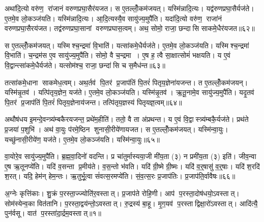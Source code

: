 अथा॑दि॒त्यो वरु॑ण॒ रा॑जानं वरुणप्रघा॒सैर॑यजत। स ए॒तल्लोँ॒कम॑जयत्। यस्मि॑न्नादि॒त्यः। यद्व॑रुणप्रघा॒सैर्यज॑ते। ए॒तमे॒व लो॒कञ्ज॑यति। यस्मि॑न्नादि॒त्यः। आ॒दि॒त्यस्यै॒व सायु॑ज्य॒मुपै॑ति। यदा॑दि॒त्यो वरु॑ण॒ राजा॑नं वरुणप्रघा॒सै\-रय॑जत। तद्व॑रुणप्रघा॒सानां वरुणप्रघास॒त्वम्। अथ॒ सोमो॒ राजा॒ छन्दासि साकमे॒धैर॑यजत॥६२॥

स ए॒तल्लोँ॒कम॑जयत्। यस्मिश्च॒न्द्रमा॑ वि॒भाति॑। यत्सा॑कमे॒धैर्यज॑ते। ए॒तमे॒व लो॒कञ्ज॑यति। यस्मिश्च॒न्द्रमा॑ वि॒भाति॑। च॒न्द्रम॑स ए॒व सायु॑ज्य॒मुपै॑ति। सोमो॒ वै च॒न्द्रमा। ए॒ष ह॒ त्वै सा॒क्षात्सोमं॑ भक्षयति। य ए॒वं वि॒द्वान्त्सा॑कमे॒धैर्यज॑ते। यत्सोम॑श्च॒ राजा॒ छन्दा॑सि च स॒मैध॑न्त॥६३॥

तत्सा॑कमे॒धाना साकमेध॒त्वम्। अथ॒र्तव॑ पि॒तर॑ प्र॒जाप॑तिं पि॒तरं॑ पितृय॒ज्ञेना॑यजन्त। त ए॒तल्लोँ॒कम॑जयन्। यस्मि॑न्नृ॒तव॑। यत्पि॑तृय॒ज्ञेन॒ यज॑ते। ए॒तमे॒व लो॒कञ्ज॑यति। यस्मि॑न्नृ॒तव॑। ऋ॒तू॒नामे॒व सायु॑ज्य॒मुपै॑ति। यदृ॒तव॑ पि॒तर॑ प्र॒जाप॑तिं पि॒तरं॑ पितृय॒ज्ञेनाय॑जन्त। तत्पि॑तृय॒ज्ञस्य॑ पितृयज्ञ॒त्वम्॥६४॥

अथौष॑धय इ॒मन्दे॒वन्त्र्य॑म्बकैरयजन्त॒ प्रथे॑म॒हीति॑। ततो॒ वै ता अ॑प्रथन्त। य ए॒वं वि॒द्वास्त्र्य॑म्बकै॒र्यज॑ते। प्रथ॑ते प्र॒जया॑ प॒शुभि॑। अथ॑ वा॒युः प॑रमे॒ष्ठिन शुनासी॒रीये॑णायजत। स ए॒तल्लोँ॒कम॑जयत्। यस्मि॑न्वा॒युः। यच्छु॑नासी॒रीये॑ण॒ यज॑ते। ए॒तमे॒व लो॒कञ्ज॑यति। यस्मि॑न्वा॒युः॥६५॥

वा॒योरे॒व सायु॑ज्य॒मुपै॑ति। ब्र॒ह्म॒वा॒दिनो॑ वदन्ति। प्र चा॑तुर्मास्यया॒जी मी॑य॒ता (३) न प्रमी॑य॒ता (३) इति॑। जीव॒न्वा ए॒ष ऋ॒तूनप्ये॑ति। यदि॑ व॒सन्ता प्र॒मीय॑ते। व॒स॒न्तो भ॑वति। यदि॑ ग्री॒ष्मे ग्री॒ष्मः। यदि॑ व॒र्॒षासु॑ व॒र्॒षाः। यदि॑ श॒रदि॑ श॒रत्। यदि॒ हेम॑न् हेम॒न्तः। ऋ॒तुर्भू॒त्वा सं॑वत्स॒रमप्ये॑ति। सं॒व॒त्स॒रः प्र॒जाप॑तिः। प्र॒जाप॑ति॒र्वावैषः॥६६॥





\clearpage
{}
\setcounter{anuvakam}{0}
अ॒ग्नेः कृत्ति॑काः। शु॒क्रं प॒रस्ता॒ज्ज्योति॑र॒वस्तात्। प्र॒जाप॑ते रोहि॒णी। आप॑ प॒रस्ता॒दोष॑धयो॒ऽवस्तात्। सोम॑स्येन्व॒का वित॑तानि। प॒रस्ता॒द्वय॑न्तो॒ऽवस्तात्। रु॒द्रस्य॑ बा॒हू। मृ॒ग॒यव॑ प॒रस्ताद्विक्षा॒रो॑ऽवस्तात्। आदि॑त्यै॒ पुन॑र्वसू। वात॑ प॒रस्ता॑दा॒र्द्रम॒वस्तात्॥१॥

